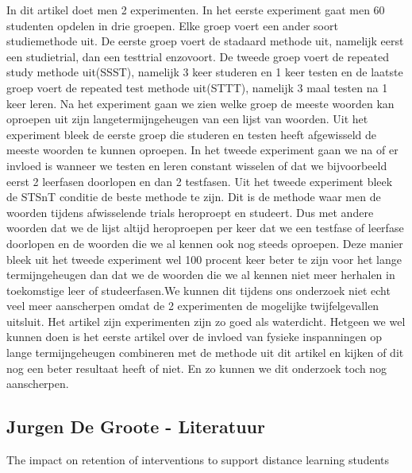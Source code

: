\documentclass{hogent-article}
\begin{document}
	In dit artikel doet men 2 experimenten. In het eerste experiment gaat men 60 studenten opdelen in drie groepen. Elke groep voert een ander soort studiemethode uit. De eerste groep voert de stadaard methode uit, namelijk eerst een studietrial, dan een testtrial enzovoort. De tweede groep voert de repeated study methode uit(SSST), namelijk 3 keer studeren en 1 keer testen en de laatste groep voert de repeated test methode uit(STTT), namelijk 3 maal testen na 1 keer leren. Na het experiment gaan we zien welke groep de meeste woorden kan oproepen uit zijn langetermijngeheugen van een lijst van woorden. Uit het experiment bleek de eerste groep die studeren en testen heeft afgewisseld de meeste woorden te kunnen oproepen. In het tweede experiment gaan we na of er invloed is wanneer we testen en leren constant wisselen of dat we bijvoorbeeld eerst 2 leerfasen doorlopen en dan 2 testfasen. Uit het tweede experiment bleek de STSnT conditie de beste methode te zijn. Dit is de methode waar men de woorden tijdens afwisselende trials heroproept en studeert. Dus met andere woorden dat we de lijst altijd heroproepen per keer dat we een testfase of leerfase doorlopen en de woorden die we al kennen ook nog steeds oproepen. Deze manier bleek uit het tweede experiment wel 100 procent keer beter te zijn voor het lange termijngeheugen dan dat we de woorden die we al kennen niet meer herhalen in toekomstige leer of studeerfasen.We kunnen dit tijdens ons onderzoek niet echt veel meer aanscherpen omdat de 2 experimenten de mogelijke twijfelgevallen uitsluit. Het artikel zijn experimenten zijn zo goed als waterdicht. Hetgeen we wel kunnen doen is het eerste artikel over de invloed van fysieke inspanningen op lange termijngeheugen combineren met de methode uit dit artikel en kijken of dit nog een beter resultaat heeft of niet. En zo kunnen we dit onderzoek toch nog aanscherpen.
	
	
	\subsection{Jurgen De Groote - Literatuur}
	
	The impact on retention of interventions to support distance learning students \autocite{Simpson2004}
	
\end{document}
